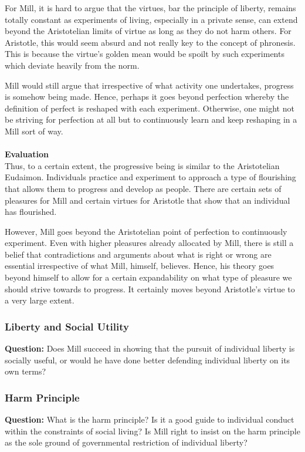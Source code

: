 \documentclass[12pt, letterpaper]{article}
\begin{document}
For Mill, it is hard to argue that the virtues, bar the principle of liberty, remains totally constant as experiments of living, especially in a private sense, can extend beyond the Aristotelian limits of virtue as long as they do not harm others. For Aristotle, this would seem absurd and not really key to the concept of phronesis. This is because the virtue's golden mean would be spoilt by such experiments which deviate heavily from the norm.

Mill would still argue that irrespective of what activity one undertakes, progress is somehow being made. Hence, perhaps it goes beyond perfection whereby the definition of perfect is reshaped with each experiment. Otherwise, one might not be striving for perfection at all but to continuously learn and keep reshaping in a Mill sort of way.
\\\\
\textbf{Evaluation}\\
Thus, to a certain extent, the progressive being is similar to the Aristotelian Eudaimon. Individuals practice and experiment to approach a type of flourishing that allows them to progress and develop as people. There are certain sets of pleasures for Mill and certain virtues for Aristotle that show that an individual has flourished.

However, Mill goes beyond the Aristotelian point of perfection to continuously experiment. Even with higher pleasures already allocated by Mill, there is still a belief that contradictions and arguments about what is right or wrong are essential irrespective of what Mill, himself, believes. Hence, his theory goes beyond himself to allow for a certain expandability on what type of pleasure we should strive towards to progress. It certainly moves beyond Aristotle's virtue to a very large extent.


\subsubsection{Liberty and Social Utility}
\textbf{Question:} Does Mill succeed in showing that the pursuit of individual liberty is socially useful, or would he have done better defending individual liberty on its own terms?




\subsubsection{Harm Principle}
\textbf{Question:} What is the harm principle? Is it a good guide to individual conduct within the constraints of social living? Is Mill right to insist on the harm principle as the sole ground of governmental restriction of individual liberty?
\end{document}
